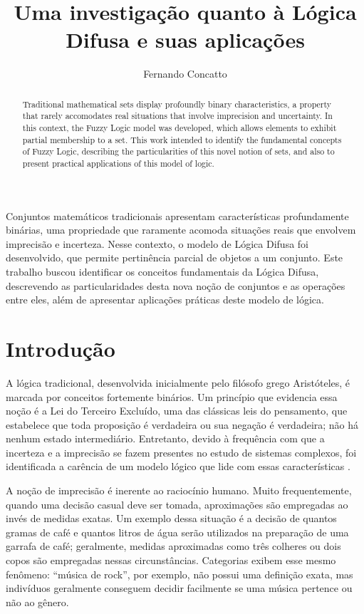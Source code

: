 \documentclass[12pt]{article}
\title{Uma investigação quanto à Lógica Difusa e suas aplicações}
\author{Fernando Concatto\inst{1}}
\begin{document}
\maketitle

\begin{abstract}
  Traditional mathematical sets display profoundly binary characteristics, a property that rarely accomodates real situations that involve imprecision and uncertainty. In this context, the Fuzzy Logic model was developed, which allows elements to exhibit partial membership to a set. This work intended to identify the fundamental concepts of Fuzzy Logic, describing the particularities of this novel notion of sets, and also to present practical applications of this model of logic.
\end{abstract}

\begin{resumo}
  Conjuntos matemáticos tradicionais apresentam características profundamente binárias, uma propriedade que raramente acomoda situações reais que envolvem imprecisão e incerteza. Nesse contexto, o modelo de Lógica Difusa foi desenvolvido, que permite pertinência parcial de objetos a um conjunto. Este trabalho buscou identificar os conceitos fundamentais da Lógica Difusa, descrevendo as particularidades desta nova noção de conjuntos e as operações entre eles, além de apresentar aplicações práticas deste modelo de lógica.
\end{resumo}

\section{Introdução} \label{sec:intro}

A lógica tradicional, desenvolvida inicialmente pelo filósofo grego Aristóteles, é marcada por conceitos fortemente binários. Um princípio que evidencia essa noção é a Lei do Terceiro Excluído, uma das clássicas leis do pensamento, que estabelece que toda proposição é verdadeira ou sua negação é verdadeira; não há nenhum estado intermediário. Entretanto, devido à frequência com que a incerteza e a imprecisão se fazem presentes no estudo de sistemas complexos, foi identificada a carência de um modelo lógico que lide com essas características \cite{Ross2010}.

A noção de imprecisão é inerente ao raciocínio humano. Muito frequentemente, quando uma decisão casual deve ser tomada, aproximações são empregadas ao invés de medidas exatas. Um exemplo dessa situação é a decisão de quantos gramas de café e quantos litros de água serão utilizados na preparação de uma garrafa de café; geralmente, medidas aproximadas como três colheres ou dois copos são empregadas nessas circunstâncias. Categorias exibem esse mesmo fenômeno: ``música de rock'', por exemplo, não possui uma definição exata, mas indivíduos geralmente conseguem decidir facilmente se uma música pertence ou não ao gênero.
\end{document}
